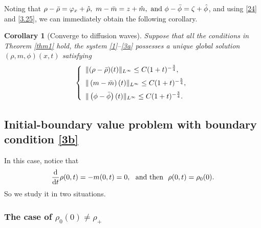 \documentclass[11pt]{article}
\theoremstyle{plain}
\newtheorem{corollary}{Corollary}[section]
\numberwithin{equation}{section}
\begin{document}
	Noting that $\rho-\bar{\rho}=\varphi_{x}+\hat{\rho},~m-\bar{m}=z+\hat{m},~{\rm and}~\phi-\bar{\phi}=\zeta+\hat{\phi}$, and using \eqref{24} and \eqref{3.25}, we can immediately obtain the following corollary.
	\begin{corollary}[{\rm Converge to diffusion waves}]
		Suppose that all the conditions in
		Theorem \ref{thm1} hold, the system \eqref{1}--\eqref{3a} possesses a unique global solution $(\rho,m,\phi)(x,t)$ satisfying
		\begin{equation}\notag
			\left\{
			\begin{array}{lr}
				\|(\rho-\bar\rho)(t)\|_{L^{\infty}}\leq C (1+t)^{-\frac{3}{4}},\\[2mm]
				\|\left(m-\bar m\right)(t)\|_{L^{\infty}}\leq C (1+t)^{-\frac{5}{4}},\\[2mm]
				\|\left(\phi-\bar\phi\right)(t)\|_{L^{\infty}}\leq C (1+t)^{-\frac{3}{4}}.	
			\end{array}
			\right.
		\end{equation}
	\end{corollary}

\subsection{Initial-boundary value problem with boundary condition \eqref{3b}}

In this case, notice that 
\begin{equation}\notag
	\frac{\rm d}{{\rm d} t}\rho(0,t)=-m(0,t)=0, ~~\mbox{and then}~~\rho(0,t)=\rho_0(0).
\end{equation}
So we study it in two situations.

\subsubsection{The case of $\rho_0(0)\neq \rho_{+}$}
\end{document}

